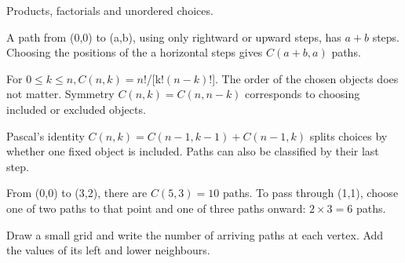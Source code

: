 \documentclass[11pt]{article}
\begin{document}
Products, factorials and unordered choices.\par
{}
A path from (0,0) to (a,b), using only rightward or upward steps, has \(a + b\) steps. Choosing the positions of the a horizontal steps gives \(C(a+b,a)\) paths.\par
For \(0 \leq  k \leq  n, C(n,k) = n\)!/[k!\((n-k)\)!]. The order of the chosen objects does not matter. Symmetry \(C(n,k) = C(n,n-k)\) corresponds to choosing included or excluded objects.\par
Pascal’s identity \(C(n,k) = C(n-1,k-1) + C(n-1,k)\) splits choices by whether one fixed object is included. Paths can also be classified by their last step.\par
{}
From (0,0) to (3,2), there are \(C(5,3) = 10\) paths. To pass through (1,1), choose one of two paths to that point and one of three paths onward: \(2 \times  3 = 6\) paths.\par
\begin{center}\end{center}
Draw a small grid and write the number of arriving paths at each vertex. Add the values of its left and lower neighbours.\par
\end{document}
